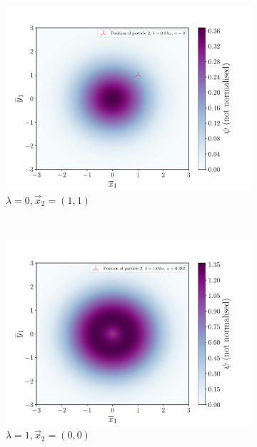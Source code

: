 \documentclass[a4paper,DIV=12,english]{scrartcl}
\begin{document}
\begin{figure}
\begin{subfigure}{0.32\textwidth}
        \centering
        \includegraphics[width=\textwidth]{../plots/wf/wf_1_1_lambda0.pdf}
        \caption{$\lambda=0, \vec{x}_2 = (1, 1)$}
        \label{subfig:wf_1_1_0}
    \end{subfigure} \\
    \begin{subfigure}{0.32\textwidth}
        \centering
        \includegraphics[width=\textwidth]{../plots/wf/wf_0_0_lambda1.pdf}
        \caption{$\lambda=1, \vec{x}_2 = (0, 0)$}
        \label{subfig:wf_0_0_1}
    \end{subfigure}
    \begin{subfigure}{0.32\textwidth}
        \centering

\end{subfigure}
\end{figure}
\end{document}

